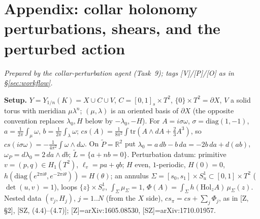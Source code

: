 \section{Appendix: collar holonomy perturbations, shears, and the perturbed action}\label{app:collar}
\emph{Prepared by the collar-perturbation agent (Task~9); tags [V]/[P]/[O] as in \S\ref{sec:workflow}.}


\noindent\textbf{Setup.} $Y=Y_{1/n}(K)=X\cup C\cup V$, $C=[0,1]_s\times T^2$, $\{0\}\times T^2=\partial X$,
$V$ a solid torus with meridian $\mu\lambda^{n}$; $(\mu,\lambda)$ is an oriented basis of $\partial X$
(the opposite convention replaces $\lambda_0,H$ below by $-\lambda_0,-H$). For $A=i\sigma\omega$,
$\sigma=\mathrm{diag}(1,-1)$, $a=\frac1{2\pi}\int_\mu\omega$, $b=\frac1{2\pi}\int_\lambda\omega$;
$cs(A)=\frac1{8\pi^2}\int\mathrm{tr}(A\wedge dA+\frac23A^3)$, so $cs(i\sigma\omega)=-\frac1{4\pi^2}\int\omega\wedge d\omega$.
On $\widetilde P=\mathbb R^2$ put $\lambda_0=a\,db-b\,da=-2b\,da+d(ab)$, $\omega_P=d\lambda_0=2\,da\wedge db$;
$\tilde L=\{a+nb=0\}$. Perturbation datum: primitive $v=(p,q)\in H_1(T^2)$, $\ell_v=pa+qb$; $H$ even,
$1$-periodic, $H(0)=0$, $h(\mathrm{diag}(e^{2\pi i\theta},e^{-2\pi i\theta}))=H(\theta)$; an annulus
$\Sigma=[s_0,s_1]\times S^1_u\subset[0,1]\times T^2$ ($\det(u,v)=1$), loops $\{z\}\times S^1_v$, $\int_\Sigma\mu_\Sigma=1$,
$\Phi(A)=\int_\Sigma h(\mathrm{Hol}_{z}A)\,\mu_\Sigma(z)$. Nested data $(v_j,H_j)$, $j=1..N$ (from the $X$ side),
$cs_\pi=cs+\sum_j\Phi_j$, as in [Z, \S2], [SZ, (4.4)--(4.7)]; [Z]=arXiv:1605.08530, [SZ]=arXiv:1710.01957.

